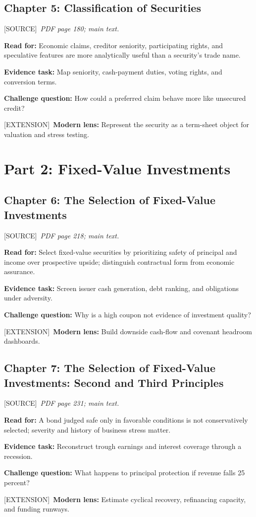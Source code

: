 \documentclass[11pt,letterpaper]{article}
\newcommand{\src}{\textsf{\color{sea}[SOURCE]}}
\newcommand{\ext}{\textsf{\color{gold}[EXTENSION]}}
\begin{document}
\subsection{Chapter 5: Classification of Securities}
\src\ \textit{PDF page 180; main text.}\par
\textbf{Read for:} Economic claims, creditor seniority, participating rights, and speculative features are more analytically useful than a security's trade name.\par
\textbf{Evidence task:} Map seniority, cash-payment duties, voting rights, and conversion terms.\par
\textbf{Challenge question:} How could a preferred claim behave more like unsecured credit?\par
\ext\ \textbf{Modern lens:} Represent the security as a term-sheet object for valuation and stress testing.\par

\section{Part 2: Fixed-Value Investments}

\subsection{Chapter 6: The Selection of Fixed-Value Investments}
\src\ \textit{PDF page 218; main text.}\par
\textbf{Read for:} Select fixed-value securities by prioritizing safety of principal and income over prospective upside; distinguish contractual form from economic assurance.\par
\textbf{Evidence task:} Screen issuer cash generation, debt ranking, and obligations under adversity.\par
\textbf{Challenge question:} Why is a high coupon not evidence of investment quality?\par
\ext\ \textbf{Modern lens:} Build downside cash-flow and covenant headroom dashboards.\par

\subsection{Chapter 7: The Selection of Fixed-Value Investments: Second and Third Principles}
\src\ \textit{PDF page 231; main text.}\par
\textbf{Read for:} A bond judged safe only in favorable conditions is not conservatively selected; severity and history of business stress matter.\par
\textbf{Evidence task:} Reconstruct trough earnings and interest coverage through a recession.\par
\textbf{Challenge question:} What happens to principal protection if revenue falls 25 percent?\par
\ext\ \textbf{Modern lens:} Estimate cyclical recovery, refinancing capacity, and funding runways.\par
\end{document}
